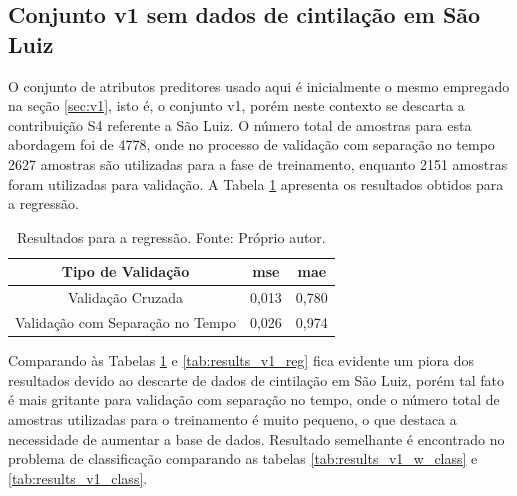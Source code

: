 \subsection{Conjunto v1 sem dados de cintilação em São Luiz}

O conjunto de atributos preditores usado aqui é inicialmente o mesmo empregado na seção \ref{sec:v1}, isto é, o conjunto v1, porém neste contexto se descarta a contribuição S4 referente a São Luiz. O número total de amostras para esta abordagem foi de 4778, onde no processo de validação com separação no tempo 2627 amostras são utilizadas para a fase de treinamento, enquanto 2151 amostras foram utilizadas para validação. A Tabela \ref{tab:results_v1_w_reg} apresenta os resultados obtidos para a regressão.

\begin{table}[H]
\begin{center}
\begin{tabular}{|c|c|c|}
\hline
Tipo de Validação & mse       & mae   \\ \hline
Validação Cruzada                   & 0,013   & 0,780  \\ \hline
Validação com Separação no Tempo    & 0,026   & 0,974  \\ \hline
\end{tabular}
\end{center}
\vspace{12pt}
\caption{Resultados para a regressão. Fonte: Próprio autor.}
\label{tab:results_v1_w_reg}
\end{table}

Comparando às Tabelas \ref{tab:results_v1_w_reg} e \ref{tab:results_v1_reg} fica evidente um piora dos resultados devido ao descarte de dados de cintilação em São Luiz, porém tal fato é mais gritante para validação com separação no tempo, onde o número total de amostras utilizadas para o treinamento é muito pequeno, o que destaca a necessidade de aumentar a base de dados. Resultado semelhante é encontrado no problema de classificação comparando as tabelas \ref{tab:results_v1_w_class} e \ref{tab:results_v1_class}.

